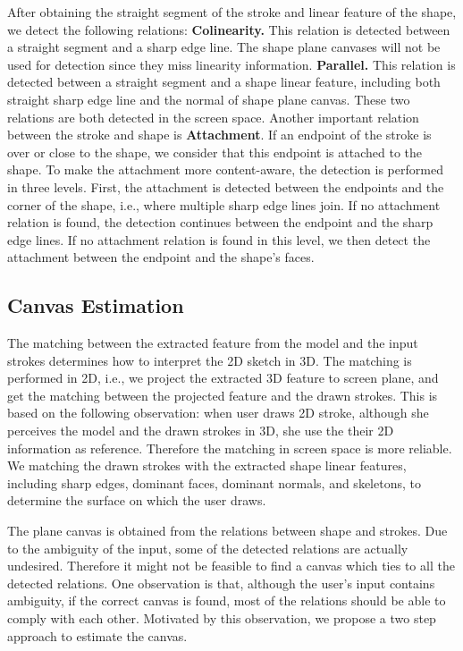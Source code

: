 %
After obtaining the straight segment of the stroke and linear feature of the shape, we detect the following relations: \textbf{Colinearity.} This relation is detected between a straight segment and a sharp edge line. The shape plane canvases will not be used for detection since they miss linearity information. \textbf{Parallel.} This relation is detected between a straight segment and a shape linear feature, including both straight sharp edge line and the normal of shape plane canvas. These two relations are both detected in the screen space. Another important relation between the stroke and shape is \textbf{Attachment}. If an endpoint of the stroke is over or close to the shape, we consider that this endpoint is attached to the shape. To make the attachment more content-aware, the detection is performed in three levels. First, the attachment is detected between the endpoints and the corner of the shape, i.e., where multiple sharp edge lines join. If no attachment relation is found, the detection continues between the endpoint and the sharp edge lines. If no attachment relation is found in this level, we then detect the attachment between the endpoint and the shape's faces.


\subsection{Canvas Estimation}
The matching between the extracted feature from the model and the input strokes determines how to interpret the 2D sketch in 3D. The matching is performed in 2D, i.e., we project the extracted 3D feature to screen plane, and get the matching between the projected feature and the drawn strokes. This is based on the following observation: when user draws 2D stroke, although she perceives the model and the drawn strokes in 3D, she use the their 2D information as reference. Therefore the matching in screen space is more reliable. We matching the drawn strokes with the extracted shape linear features, including sharp edges, dominant faces, dominant normals, and skeletons, to determine the surface on which the user draws.

The plane canvas is obtained from the relations between shape and strokes. Due to the ambiguity of the input, some of the detected relations are actually undesired. Therefore it might not be feasible to find a canvas which ties to all the detected relations. One observation is that, although the user's input contains ambiguity, if the correct canvas is found, most of the relations should be able to comply with each other. Motivated by this observation, we propose a two step approach to estimate the canvas.

